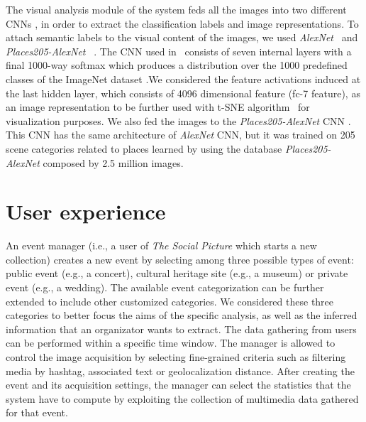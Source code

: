 The visual analysis module of the system feds all the images into two different CNNs \cite{krizhevsky2012imagenet, zhou2014learning}, in order to extract the classification labels and image representations. To attach semantic labels to the visual content of the images, we used \textit{AlexNet}~\cite{krizhevsky2012imagenet} and \textit{Places205-AlexNet}~ \cite{zhou2014learning}.
The CNN used in~\cite{krizhevsky2012imagenet} consists of seven internal layers with a final 1000-way softmax which produces a distribution over the 1000 predefined classes of the ImageNet dataset \cite{ILSVRC15}.We considered the feature activations induced at the last hidden layer, which consists of 4096 dimensional feature (fc-7 feature), as an image representation to be further used with t-SNE algorithm~\cite{van2008visualizing} for visualization purposes.
We also fed the images to the \textit{Places205-AlexNet} CNN \cite{zhou2014learning}. This CNN has the same architecture of \textit{AlexNet} CNN, but it was trained on 205 scene categories related to places learned by using the database \textit{Places205-AlexNet} composed by 2.5 million images.

\section{User experience}
An event manager (i.e., a user of \textit{The Social Picture} which starts a new collection) creates a new event by selecting among three possible types of event: public event (e.g., a concert), cultural heritage site (e.g., a museum) or private event (e.g., a wedding). The available event categorization can be further extended to include other customized categories. We considered these three categories to better focus the aims of the specific analysis, as well as the inferred information that an organizator wants to extract.
The data gathering from users can be performed within a specific time window. The manager is allowed to control the image acquisition by selecting fine-grained criteria such as filtering media by hashtag, associated text or geolocalization distance.
After creating the event and its acquisition settings, the manager can select the statistics that the system have to compute by exploiting the collection of multimedia data gathered for that event.

